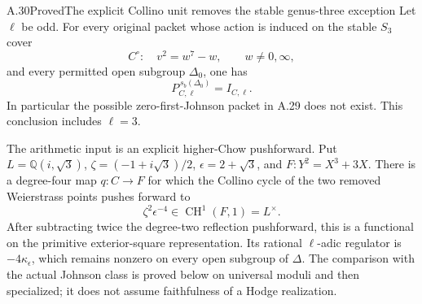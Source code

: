 \begin{statement}{A.30}{Proved}{The explicit Collino unit removes the stable genus-three exception}
Let $\ell$ be odd. For every original packet whose action is
induced on the stable $S_3$ cover
\[
                  C^\circ:\quad v^2=w^7-w,\qquad w\ne0,\infty,
\]
and every permitted open subgroup $\Delta_0$, one has
\[
                    P_{C,\ell}^{\,s_b(\Delta_0)}=I_{C,\ell}.
                                                        \tag{A.30.1}
\]
In particular the possible zero-first-Johnson packet in A.29
does not exist. This conclusion includes $\ell=3$.

The arithmetic input is an explicit higher-Chow pushforward.
Put $L=\mathbb Q(i,\sqrt3)$, $\zeta=(-1+i\sqrt3)/2$,
$\epsilon=2+\sqrt3$, and $F:Y^2=X^3+3X$. There is a
degree-four map $q:C\to F$ for which the Collino cycle of
the two removed Weierstrass points pushes forward to
\[
                  \zeta^2\epsilon^{-4}\in
                    \operatorname{CH}^1(F,1)=L^\times.
                                                        \tag{A.30.2}
\]
After subtracting twice the degree-two reflection
pushforward, this is a functional on the primitive
exterior-square representation. Its rational
$\ell$-adic regulator is $-4\kappa_\epsilon$, which
remains nonzero on every open subgroup of $\Delta$.
The comparison with the actual Johnson class is proved
below on universal moduli and then specialized; it does
not assume faithfulness of a Hodge realization.
\end{statement}
